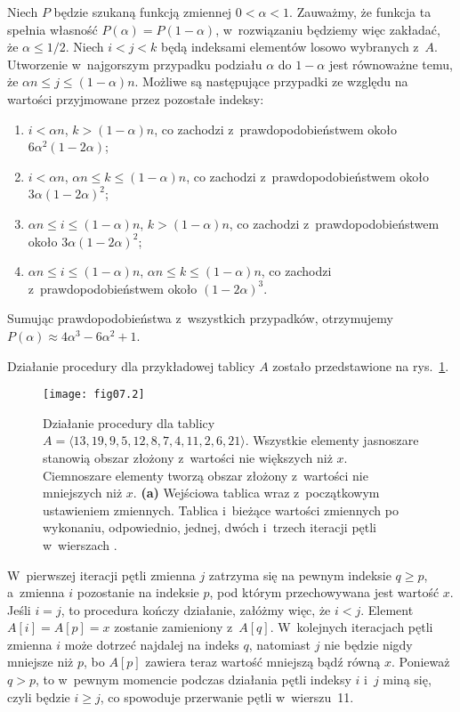 \exercise %
Niech $P$ będzie szukaną funkcją zmiennej $0<\alpha<1$. Zauważmy, że funkcja ta spełnia własność $P(\alpha)=P(1-\alpha)$, w~rozwiązaniu będziemy więc zakładać, że $\alpha\le1/2$. Niech $i<j<k$ będą indeksami elementów losowo wybranych z~$A$. Utworzenie w~najgorszym przypadku podziału $\alpha$ do $1-\alpha$ jest równoważne temu, że $\alpha n\le j\le(1-\alpha)n$. Możliwe są następujące przypadki ze względu na wartości przyjmowane przez pozostałe indeksy:
\begin{enumerate}
	\renewcommand{\labelenumi}{(\roman{enumi})}
	\item $i<\alpha n$, $k>(1-\alpha)n$, co zachodzi z~prawdopodobieństwem około $6\alpha^2(1-2\alpha)$;
	\item $i<\alpha n$, $\alpha n\le k\le(1-\alpha)n$, co zachodzi z~prawdopodobieństwem około $3\alpha(1-2\alpha)^2$;
	\item $\alpha n\le i\le(1-\alpha)n$, $k>(1-\alpha)n$, co zachodzi z~prawdopodobieństwem około $3\alpha(1-2\alpha)^2$;
	\item $\alpha n\le i\le(1-\alpha)n$, $\alpha n\le k\le(1-\alpha)n$, co zachodzi z~prawdopodobieństwem około $(1-2\alpha)^3$.
\end{enumerate}
Sumując prawdopodobieństwa z~wszystkich przypadków, otrzymujemy $P(\alpha)\approx4\alpha^3-6\alpha^2+1$.

\problems


\subproblem %
Działanie procedury  dla przykładowej tablicy $A$ zostało przedstawione na rys.~\ref{fig:7-1a}.
\begin{figure}[ht]
	\begin{center}
		\texttt{[image: fig07.2]}
	\end{center}
	\caption{Działanie procedury  dla tablicy $A=\langle13,19,9,5,12,8,7,4,11,2,6,21\rangle$. Wszystkie elementy jasnoszare stanowią obszar złożony z~wartości nie większych niż $x$. Ciemnoszare elementy tworzą obszar złożony z~wartości nie mniejszych niż $x$. {\sffamily\bfseries(a)} Wejściowa tablica wraz z~początkowym ustawieniem zmiennych. {\sffamily\bfseries{}} Tablica i~bieżące wartości zmiennych po wykonaniu, odpowiednio, jednej, dwóch i~trzech iteracji pętli  w~wierszach .} \label{fig:7-1a}
\end{figure}

\subproblem %
W~pierwszej iteracji pętli  zmienna $j$ zatrzyma się na pewnym indeksie $q\ge p$, a~zmienna $i$ pozostanie na indeksie $p$, pod którym przechowywana jest wartość $x$. Jeśli $i=j$, to procedura kończy działanie, załóżmy więc, że $i<j$. Element $A[i]=A[p]=x$ zostanie zamieniony z~$A[q]$. W~kolejnych iteracjach pętli  zmienna $i$ może dotrzeć najdalej na indeks $q$, natomiast $j$ nie będzie nigdy mniejsze niż $p$, bo $A[p]$ zawiera teraz wartość mniejszą bądź równą $x$. Ponieważ $q>p$, to w~pewnym momencie podczas działania pętli indeksy $i$ i~$j$ miną się, czyli będzie $i\ge j$, co spowoduje przerwanie pętli w~wierszu~11.

